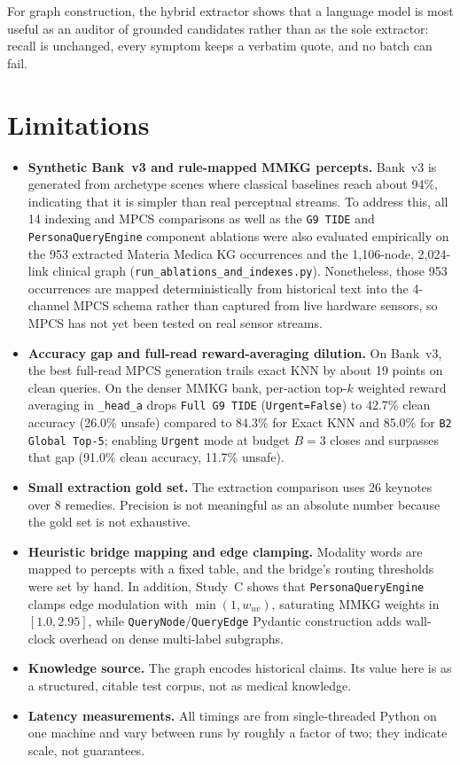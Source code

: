 \documentclass[12pt,a4paper,oneside]{report}
\newcommand{\code}[1]{\texttt{\small #1}}
\begin{document}
For graph construction, the hybrid extractor shows that a language model is most useful as an auditor of grounded candidates rather than as the sole extractor: recall is unchanged, every symptom keeps a verbatim quote, and no batch can fail.

\section{Limitations}
\begin{itemize}
  \item \textbf{Synthetic Bank~v3 and rule-mapped MMKG percepts.} Bank~v3 is generated from archetype scenes where classical baselines reach about 94\%, indicating that it is simpler than real perceptual streams. To address this, all 14 indexing and MPCS comparisons as well as the \code{G9 TIDE} and \code{PersonaQueryEngine} component ablations were also evaluated empirically on the 953 extracted Materia Medica KG occurrences and the 1{,}106-node, 2{,}024-link clinical graph (\code{run\_ablations\_and\_indexes.py}). Nonetheless, those 953 occurrences are mapped deterministically from historical text into the 4-channel MPCS schema rather than captured from live hardware sensors, so MPCS has not yet been tested on real sensor streams.
  \item \textbf{Accuracy gap and full-read reward-averaging dilution.} On Bank~v3, the best full-read MPCS generation trails exact KNN by about 19 points on clean queries. On the denser MMKG bank, per-action top-$k$ weighted reward averaging in \code{\_head\_a} drops \code{Full G9 TIDE} (\code{Urgent=False}) to 42.7\% clean accuracy (26.0\% unsafe) compared to 84.3\% for Exact KNN and 85.0\% for \code{B2 Global Top-5}; enabling \code{Urgent} mode at budget $B=3$ closes and surpasses that gap (91.0\% clean accuracy, 11.7\% unsafe).
  \item \textbf{Small extraction gold set.} The extraction comparison uses 26 keynotes over 8 remedies. Precision is not meaningful as an absolute number because the gold set is not exhaustive.
  \item \textbf{Heuristic bridge mapping and edge clamping.} Modality words are mapped to percepts with a fixed table, and the bridge's routing thresholds were set by hand. In addition, Study~C shows that \code{PersonaQueryEngine} clamps edge modulation with $\min(1, w_{uv})$, saturating MMKG weights in $[1.0, 2.95]$, while \code{QueryNode}/\code{QueryEdge} Pydantic construction adds wall-clock overhead on dense multi-label subgraphs.
  \item \textbf{Knowledge source.} The graph encodes historical claims. Its value here is as a structured, citable test corpus, not as medical knowledge.
  \item \textbf{Latency measurements.} All timings are from single-threaded Python on one machine and vary between runs by roughly a factor of two; they indicate scale, not guarantees.
\end{itemize}
\end{document}
